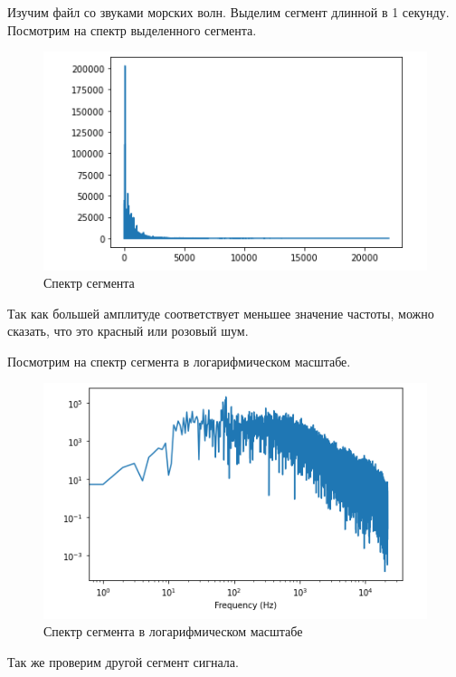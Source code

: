 \documentclass[a4paper, 14pt]{extarticle}
\begin{document}
    Изучим файл со звуками морских волн.
    Выделим сегмент длинной в 1 секунду.
    Посмотрим на спектр выделенного сегмента.

    \begin{figure}[H]
        \centering
        \includegraphics[width=0.8\linewidth]{sea_segment_spectr}
        \caption{Спектр сегмента}
        \label{fig:sea_segment_spectr}
    \end{figure}

    Так как большей амплитуде соответствует меньшее значение частоты, можно сказать, что это красный или розовый шум.

    Посмотрим на спектр сегмента в логарифмическом масштабе.

    \begin{figure}[H]
        \centering
        \includegraphics[width=0.8\linewidth]{sea_segment_spectr_log}
        \caption{Спектр сегмента в логарифмическом масштабе}
        \label{fig:sea_segment_spectr_log}
    \end{figure}

    Так же проверим другой сегмент сигнала.
\end{document}
